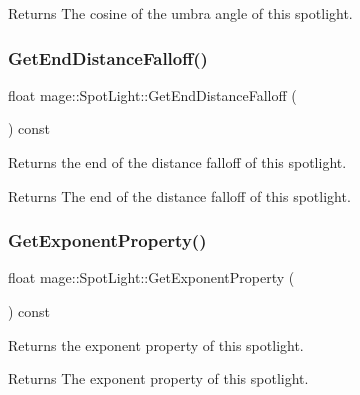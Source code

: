 \begin{DoxyReturn}{Returns}
The cosine of the umbra angle of this spotlight. 
\end{DoxyReturn}
\hypertarget{classmage_1_1_spot_light_a3e6767992846e17a9bebb66519c30f19}{}\label{classmage_1_1_spot_light_a3e6767992846e17a9bebb66519c30f19} 
\subsubsection{\texorpdfstring{Get\+End\+Distance\+Falloff()}{GetEndDistanceFalloff()}}
{\footnotesize\ttfamily float mage\+::\+Spot\+Light\+::\+Get\+End\+Distance\+Falloff (\begin{DoxyParamCaption}{ }\end{DoxyParamCaption}) const}

Returns the end of the distance falloff of this spotlight.

\begin{DoxyReturn}{Returns}
The end of the distance falloff of this spotlight. 
\end{DoxyReturn}
\hypertarget{classmage_1_1_spot_light_aaff34ca166a8a129f461579869803aaa}{}\label{classmage_1_1_spot_light_aaff34ca166a8a129f461579869803aaa} 
\subsubsection{\texorpdfstring{Get\+Exponent\+Property()}{GetExponentProperty()}}
{\footnotesize\ttfamily float mage\+::\+Spot\+Light\+::\+Get\+Exponent\+Property (\begin{DoxyParamCaption}{ }\end{DoxyParamCaption}) const}

Returns the exponent property of this spotlight.

\begin{DoxyReturn}{Returns}
The exponent property of this spotlight. 
\end{DoxyReturn}
\hypertarget{classmage_1_1_spot_light_a4945555b7570f48c7ffa505b60b6b8cc}{}\label{classmage_1_1_spot_light_a4945555b7570f48c7ffa505b60b6b8cc} 
